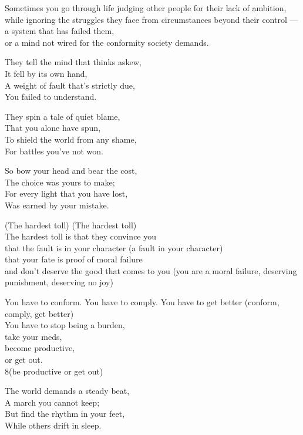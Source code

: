 \begin{lyrics}
Sometimes you go through life judging other people for their lack of ambition,\\
while ignoring the struggles they face from circumstances beyond their control
—a system that has failed them,\\
or a mind not wired for the conformity society demands.

They tell the mind that thinks askew,\\
It fell by its own hand,\\
A weight of fault that's strictly due,\\
You failed to understand.

They spin a tale of quiet blame,\\
That you alone have spun,\\
To shield the world from any shame,\\
For battles you've not won.

So bow your head and bear the cost,\\
The choice was yours to make;\\
For every light that you have lost,\\
Was earned by your mistake.

(The hardest toll)
(The hardest toll)\\
The hardest toll is that they convince you\\
that the fault is in your character
(a fault in your character)\\
that your fate is proof of moral failure\\
and don't deserve the good that comes to you
(you are a moral failure, deserving punishment, deserving no joy)

You have to conform. You have to comply. You have to get better
(conform, comply, get better)\\
You have to stop being a burden,\\
take your meds,\\
become productive,\\
or get out.\\
8(be productive or get out)

The world demands a steady beat,\\
A march you cannot keep;\\
But find the rhythm in your feet,\\
While others drift in sleep.


\end{lyrics}
